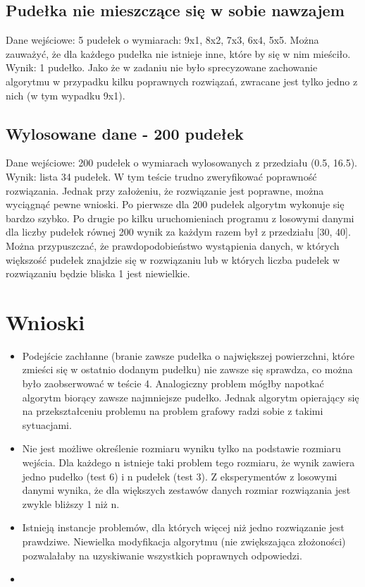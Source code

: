 \documentclass{article}
\begin{document}
\subsection{Pudełka nie mieszczące się w sobie nawzajem}
Dane wejściowe: 5 pudełek o wymiarach: 9x1, 8x2, 7x3, 6x4, 5x5. Można zauważyć, że dla każdego pudełka nie istnieje inne, które by się w nim mieściło.\\
Wynik: 1 pudełko. Jako że w zadaniu nie było sprecyzowane zachowanie algorytmu w przypadku kilku poprawnych rozwiązań, zwracane jest tylko jedno z nich (w tym wypadku 9x1).

\subsection{Wylosowane dane - 200 pudełek}
Dane wejściowe: 200 pudełek o wymiarach wylosowanych z przedziału (0.5, 16.5). \\
Wynik: lista 34 pudełek. W tym teście trudno zweryfikować poprawność rozwiązania. Jednak przy założeniu, że rozwiązanie jest poprawne, można wyciągnąć pewne wnioski. Po pierwsze dla 200 pudełek algorytm wykonuje się bardzo szybko. Po drugie po kilku uruchomieniach programu z losowymi danymi dla liczby pudełek równej 200 wynik za każdym razem był z przedziału [30, 40]. Można przypuszczać, że prawdopodobieństwo wystąpienia danych, w których większość pudełek znajdzie się w rozwiązaniu lub w których liczba pudełek w rozwiązaniu będzie bliska 1 jest niewielkie.
\section{Wnioski}
\begin{itemize}
\item Podejście zachłanne (branie zawsze pudełka o największej powierzchni, które zmieści się w ostatnio dodanym pudełku) nie zawsze się sprawdza, co można było zaobserwować w teście 4. Analogiczny problem mógłby napotkać algorytm biorący zawsze najmniejsze pudełko. Jednak algorytm opierający się na przekształceniu problemu na problem grafowy radzi sobie z takimi sytuacjami.
\item Nie jest możliwe określenie rozmiaru wyniku tylko na podstawie rozmiaru wejścia. Dla każdego n istnieje taki problem tego rozmiaru, że wynik zawiera jedno pudełko (test 6) i n pudełek (test 3). Z eksperymentów z losowymi danymi wynika, że dla większych zestawów danych rozmiar rozwiązania jest zwykle bliższy 1 niż n.
\item Istnieją instancje problemów, dla których więcej niż jedno rozwiązanie jest prawdziwe. Niewielka modyfikacja algorytmu (nie zwiększająca złożoności) pozwalałaby na uzyskiwanie wszystkich poprawnych odpowiedzi.
\item 
\end{itemize}
\end{document}
